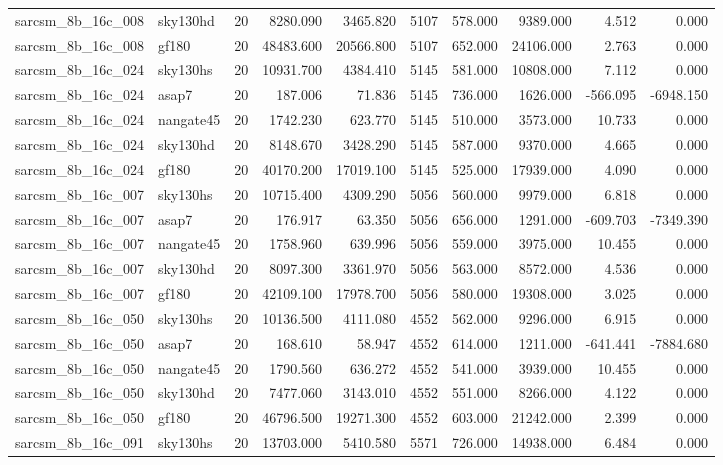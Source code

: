 \begin{tabular}{llrrrrrrrr}
sarcsm\_8b\_16c\_008 & sky130hd & 20 & 8280.090 & 3465.820 & 5107 & 578.000 & 9389.000 & 4.512 & 0.000 \\
sarcsm\_8b\_16c\_008 & gf180 & 20 & 48483.600 & 20566.800 & 5107 & 652.000 & 24106.000 & 2.763 & 0.000 \\
sarcsm\_8b\_16c\_024 & sky130hs & 20 & 10931.700 & 4384.410 & 5145 & 581.000 & 10808.000 & 7.112 & 0.000 \\
sarcsm\_8b\_16c\_024 & asap7 & 20 & 187.006 & 71.836 & 5145 & 736.000 & 1626.000 & -566.095 & -6948.150 \\
sarcsm\_8b\_16c\_024 & nangate45 & 20 & 1742.230 & 623.770 & 5145 & 510.000 & 3573.000 & 10.733 & 0.000 \\
sarcsm\_8b\_16c\_024 & sky130hd & 20 & 8148.670 & 3428.290 & 5145 & 587.000 & 9370.000 & 4.665 & 0.000 \\
sarcsm\_8b\_16c\_024 & gf180 & 20 & 40170.200 & 17019.100 & 5145 & 525.000 & 17939.000 & 4.090 & 0.000 \\
sarcsm\_8b\_16c\_007 & sky130hs & 20 & 10715.400 & 4309.290 & 5056 & 560.000 & 9979.000 & 6.818 & 0.000 \\
sarcsm\_8b\_16c\_007 & asap7 & 20 & 176.917 & 63.350 & 5056 & 656.000 & 1291.000 & -609.703 & -7349.390 \\
sarcsm\_8b\_16c\_007 & nangate45 & 20 & 1758.960 & 639.996 & 5056 & 559.000 & 3975.000 & 10.455 & 0.000 \\
sarcsm\_8b\_16c\_007 & sky130hd & 20 & 8097.300 & 3361.970 & 5056 & 563.000 & 8572.000 & 4.536 & 0.000 \\
sarcsm\_8b\_16c\_007 & gf180 & 20 & 42109.100 & 17978.700 & 5056 & 580.000 & 19308.000 & 3.025 & 0.000 \\
sarcsm\_8b\_16c\_050 & sky130hs & 20 & 10136.500 & 4111.080 & 4552 & 562.000 & 9296.000 & 6.915 & 0.000 \\
sarcsm\_8b\_16c\_050 & asap7 & 20 & 168.610 & 58.947 & 4552 & 614.000 & 1211.000 & -641.441 & -7884.680 \\
sarcsm\_8b\_16c\_050 & nangate45 & 20 & 1790.560 & 636.272 & 4552 & 541.000 & 3939.000 & 10.455 & 0.000 \\
sarcsm\_8b\_16c\_050 & sky130hd & 20 & 7477.060 & 3143.010 & 4552 & 551.000 & 8266.000 & 4.122 & 0.000 \\
sarcsm\_8b\_16c\_050 & gf180 & 20 & 46796.500 & 19271.300 & 4552 & 603.000 & 21242.000 & 2.399 & 0.000 \\
sarcsm\_8b\_16c\_091 & sky130hs & 20 & 13703.000 & 5410.580 & 5571 & 726.000 & 14938.000 & 6.484 & 0.000 \\

\end{tabular}
